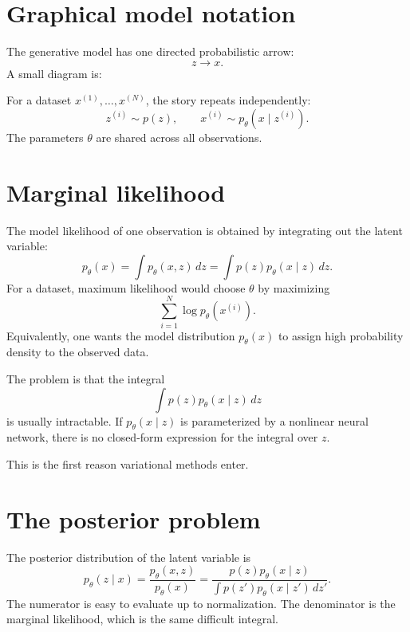 \section{Graphical model notation}

The generative model has one directed probabilistic arrow:
\[
  z\longrightarrow x.
\]
A small diagram is:

\begin{center}
\end{center}

For a dataset \(x^{(1)},\ldots,x^{(N)}\), the story repeats independently:
\[
  z^{(i)}\sim p(z),\qquad x^{(i)}\sim p_\theta(x\mid z^{(i)}).
\]
The parameters \(\theta\) are shared across all observations.

\section{Marginal likelihood}

The model likelihood of one observation is obtained by integrating out the latent variable:
\[
  p_\theta(x)=\int p_\theta(x,z)\,dz
  =\int p(z)p_\theta(x\mid z)\,dz.
\]
For a dataset, maximum likelihood would choose \(\theta\) by maximizing
\[
  \sum_{i=1}^N \log p_\theta(x^{(i)}).
\]
Equivalently, one wants the model distribution \(p_\theta(x)\) to assign high probability density to the observed data.

The problem is that the integral
\[
  \int p(z)p_\theta(x\mid z)\,dz
\]
is usually intractable.  If \(p_\theta(x\mid z)\) is parameterized by a nonlinear neural network, there is no closed-form expression for the integral over \(z\).

This is the first reason variational methods enter.

\section{The posterior problem}

The posterior distribution of the latent variable is
\[
  p_\theta(z\mid x)=\frac{p_\theta(x,z)}{p_\theta(x)}
  =\frac{p(z)p_\theta(x\mid z)}{\int p(z')p_\theta(x\mid z')\,dz'}.
\]
The numerator is easy to evaluate up to normalization.  The denominator is the marginal likelihood, which is the same difficult integral.

